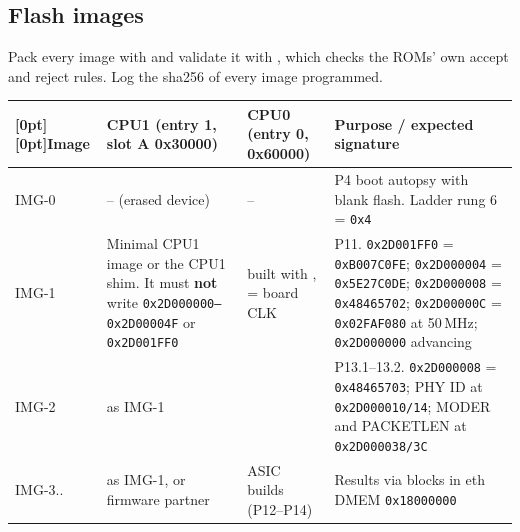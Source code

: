 \documentclass[10pt,a4paper]{article}
\newcommand\hd[1]{\textbf{#1}}
\begin{document}
\subsection{Flash images}\label{sec:images}
Pack every image with  and validate it with , which checks the ROMs' own accept and reject rules. Log the sha256 of every image programmed.

{\footnotesize
\setlength{\tabcolsep}{4pt}
\begin{longtable}{@{}P{1.2cm}P{4.2cm}P{4.2cm}P{6.4cm}@{}}
\toprule
{}[0pt][0pt]\hd{Image} & \hd{CPU1 (entry 1, slot A 0x30000)} & \hd{CPU0 (entry 0, 0x60000)} & \hd{Purpose / expected signature}\\
\midrule
\endhead
IMG-0 & -- (erased device) & -- & P4 boot autopsy with blank flash. Ladder rung 6 = \texttt{0x4} \\
IMG-1 & Minimal CPU1 image or the CPU1 shim. It must \textbf{not} write \texttt{0x2D000000--0x2D00004F} or \texttt{0x2D001FF0} &  built with ,  = board CLK & P11. \texttt{0x2D001FF0} = \texttt{0xB007C0FE}; \texttt{0x2D000004} = \texttt{0x5E27C0DE}; \texttt{0x2D000008} = \texttt{0x48465702}; \texttt{0x2D00000C} = \texttt{0x02FAF080} at 50\,MHz; \texttt{0x2D000000} advancing \\
IMG-2 & as IMG-1 &  & P13.1--13.2. \texttt{0x2D000008} = \texttt{0x48465703}; PHY ID at \texttt{0x2D000010/14}; MODER and PACKETLEN at \texttt{0x2D000038/3C} \\
IMG-3.. & as IMG-1, or firmware partner &  ASIC builds (P12--P14) & Results via  blocks in eth DMEM \texttt{0x18000000} \\
\bottomrule
\end{longtable}\addtocounter{table}{-1}}
\end{document}
